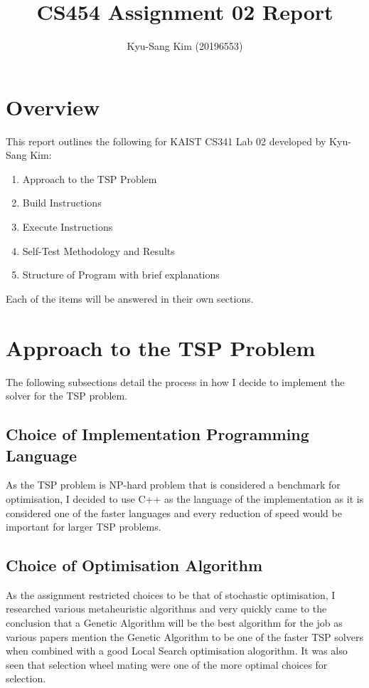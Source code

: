 \documentclass[12pt]{article}
\begin{document}
\title{CS454 Assignment 02 Report}
\author{Kyu-Sang Kim (20196553)}
\maketitle

\section{Overview}
This report outlines the following for KAIST CS341 Lab 02 developed by Kyu-Sang Kim:

\begin{enumerate}
	\item Approach to the TSP Problem
	\item Build Instructions
	\item Execute Instructions
	\item Self-Test Methodology and Results
	\item Structure of Program with brief explanations
\end{enumerate}

Each of the items will be answered in their own sections.

\section{Approach to the TSP Problem}
The following subsections detail the process in how I decide to implement the solver for the TSP problem.

\subsection{Choice of Implementation Programming Language}
As the TSP problem is NP-hard problem that is considered a benchmark for optimisation, I decided to use C++ as the language of the implementation as it is considered one of the faster languages and every reduction of speed would be important for larger TSP problems.

\subsection{Choice of Optimisation Algorithm}
As the assignment restricted choices to be that of stochastic optimisation, I researched various metaheuristic algorithms and very quickly came to the conclusion that a Genetic Algorithm will be the best algorithm for the job as various papers mention the Genetic Algorithm to be one of the faster TSP solvers when combined with a good Local Search optimisation alogorithm. It was also seen that selection wheel mating were one of the more optimal choices for selection.
\end{document}

